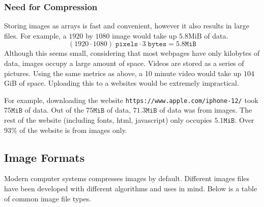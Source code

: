 \documentclass{article}
\begin{document}
\subsubsection{Need for Compression}
Storing images as arrays is fast and convenient, however it also results in large files.
For example, a $1920$ by $1080$ image would take up $5.8$MiB of data.
\begin{equation}
	(1920 \cdot 1080)\; \texttt{pixels} \cdot 3\; \texttt{bytes} = 5.8 \texttt{MiB}
\end{equation}
Although this seems small, considering that most webpages have only kilobytes of data, images occupy a large amount of space. 
Videos are stored as a series of pictures.
Using the same metrics as above, a 10 minute video would take up $104$GiB of space.
Uploading this to a websites would be extremely impractical.

For example, downloading the website \texttt{https://www.apple.com/iphone-12/} took $75\texttt{MiB}$ of data.
Out of the $75\texttt{MiB}$ of data, $71.3\texttt{MiB}$ of data was from images.
The rest of the website (including fonts, html, javascript) only occupies $5.1\texttt{MiB}$.
Over $93\%$ of the website is from images only.

\subsection{Image Formats}
Modern computer systems compresses images by default.
Different images files have been developed with different algorithms and uses in mind.
Below is a table of common image file types.
\end{document}
